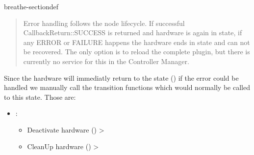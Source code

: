 \documentclass[letterpaper,10pt,english]{sphinxmanual}
\begin{document}
\begin{fulllineitems}
\begin{sphinxuseclass}{breathe-sectiondef}
\begin{fulllineitems}
\begin{quote}
\sphinxAtStartPar
Error handling follows the node lifecycle. If successful CallbackReturn::SUCCESS is returned and hardware is again in  state, if any ERROR or FAILURE happens the hardware ends in  state and can not be recovered. The only option is to reload the complete plugin, but there is currently no service for this in the Controller Manager. 
\end{quote}


\sphinxAtStartPar
Since the hardware will immediatly return to the  state () if the error could be handled we manually call the transition functions which would normally be called to this state. Those are:\begin{itemize}
\item {} 
\sphinxAtStartPar
{}: \begin{itemize}
\item {} 
\sphinxAtStartPar
Deactivate hardware ({\hyperref[\detokenize{code/bioscara_hardware_interfaces/index:classbioscara__hardware__interfaces_1_1BioscaraArmHardwareInterface_1ab126441df1ddd42eee72667dd3d91301}]{}}) \sphinxhyphen{}\textgreater{} 

\item {} 
\sphinxAtStartPar
Clean\sphinxhyphen{}Up hardware ({\hyperref[\detokenize{code/bioscara_hardware_interfaces/index:classbioscara__hardware__interfaces_1_1BioscaraArmHardwareInterface_1a1bec98b0fd955e1403ebc224e3562082}]{}}) \sphinxhyphen{}\textgreater{} 

\end{itemize}



\end{itemize}
\end{fulllineitems}
\end{sphinxuseclass}
\end{fulllineitems}
\end{document}
